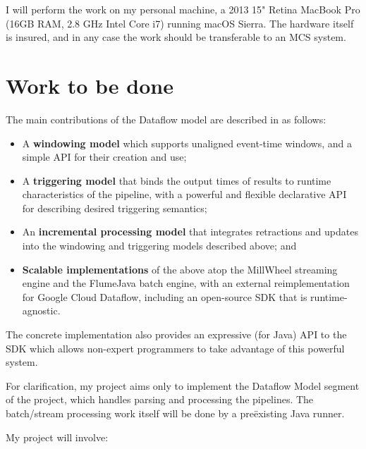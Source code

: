I will perform the work on my personal machine, a 2013 15" Retina MacBook Pro (16GB RAM, 2.8 GHz Intel Core i7) running macOS Sierra. The hardware itself is insured, and in any case the work should be transferable to an MCS system.

\section*{Work to be done}

The main contributions of the Dataflow model are described in \cite{Akidau:2015} as follows:

\begin{itemize}
	\item A \textbf{windowing model} which supports unaligned event-time windows, and a simple API for their creation and use;
	\item A \textbf{triggering model} that binds the output times of results to runtime characteristics of the pipeline, with a powerful and flexible declarative API for describing desired triggering semantics;
	\item An \textbf{incremental processing model} that integrates retractions and updates into the windowing and triggering models described above; and
	\item \textbf{Scalable implementations} of the above atop the MillWheel streaming engine and the FlumeJava batch engine, with an external reimplementation for Google Cloud Dataflow, including an open-source SDK that is runtime-agnostic.
\end{itemize}

The concrete implementation also provides an expressive (for Java) API to the SDK which allows non-expert programmers to take advantage of this powerful system.

For clarification, my project aims only to implement the Dataflow Model segment of the project, which handles parsing and processing the pipelines. The batch/stream processing work itself will be done by a pre\"existing Java runner.

My project will involve:


